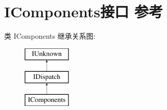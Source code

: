 \hypertarget{interface_i_components}{}\section{I\+Components接口 参考}
\label{interface_i_components}
类 I\+Components 继承关系图\+:\begin{figure}[H]
\begin{center}
\leavevmode
\includegraphics[height=3.000000cm]{interface_i_components}
\end{center}
\end{figure}
